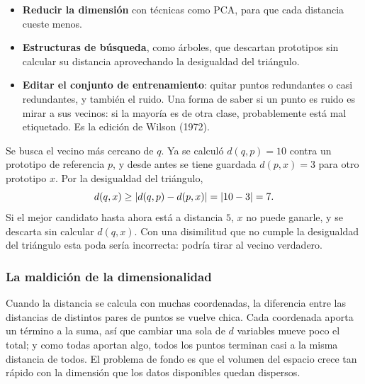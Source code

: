 \documentclass[11pt,letterpaper]{article}
\begin{document}
\begin{itemize}[itemsep=0.3em]
    \item \textbf{Reducir la dimensión} con técnicas como PCA, para que
          cada distancia cueste menos.
    \item \textbf{Estructuras de búsqueda}, como árboles, que descartan
          prototipos sin calcular su distancia aprovechando la
          desigualdad del triángulo.
    \item \textbf{Editar el conjunto de entrenamiento}: quitar puntos
          redundantes o casi redundantes, y también el ruido. Una
          forma de saber si un punto es ruido es mirar a sus vecinos:
          si la mayoría es de otra clase, probablemente está mal
          etiquetado. Es la edición de Wilson (1972).
\end{itemize}

\begin{ejemplo}
    Se busca el vecino más cercano de $q$. Ya se calculó
    $d(q, p) = 10$ contra un prototipo de referencia $p$, y desde antes
    se tiene guardada $d(p, x) = 3$ para otro prototipo $x$. Por la
    desigualdad del triángulo,
    \[
        d(q, x) \geq \left\lvert d(q, p) - d(p, x) \right\rvert = \left\lvert 10 - 3 \right\rvert = 7 .
    \]
    Si el mejor candidato hasta ahora está a distancia $5$, $x$ no
    puede ganarle, y se descarta sin calcular $d(q, x)$. Con una
    disimilitud que no cumple la desigualdad del triángulo esta poda
    sería incorrecta: podría tirar al vecino verdadero.
\end{ejemplo}

\subsubsection*{La maldición de la dimensionalidad}

Cuando la distancia se calcula con muchas coordenadas, la diferencia
entre las distancias de distintos pares de puntos se vuelve chica.
Cada coordenada aporta un término a la suma, así que cambiar una sola
de $d$ variables mueve poco el total; y como todas aportan algo, todos
los puntos terminan casi a la misma distancia de todos. El problema de
fondo es que el volumen del espacio crece tan rápido con la dimensión
que los datos disponibles quedan dispersos.
\end{document}
